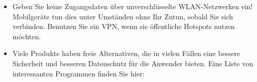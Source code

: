 \documentclass[10pt,foldmark,tumble]{leaflet}
\newcommand{\barcode}[1]{
\begin{pspicture}(1cm,1cm) 
\psbarcode[scalex=0.4,scaley=0.4]{#1}{}{qrcode} 
\end{pspicture}
}
\begin{document}
\begin{itemize}
  
 \item Geben Sie keine Zugangsdaten über unverschlüsselte WLAN-Netzwerken ein! Mobilgeräte tun
 dies unter Umständen ohne Ihr Zutun, sobald Sie sich verbinden. Benutzen Sie ein VPN, wenn sie 
 öffentliche Hotspots nutzen möchten.

 \item Viele Produkte haben freie Alternativen, die in vielen Fällen eine bessere Sicherheit
 und besseren Datenschutz für die Anwender bieten. Eine Liste von interessanten Programmen finden
 Sie hier:
\end{itemize}
\end{document}
